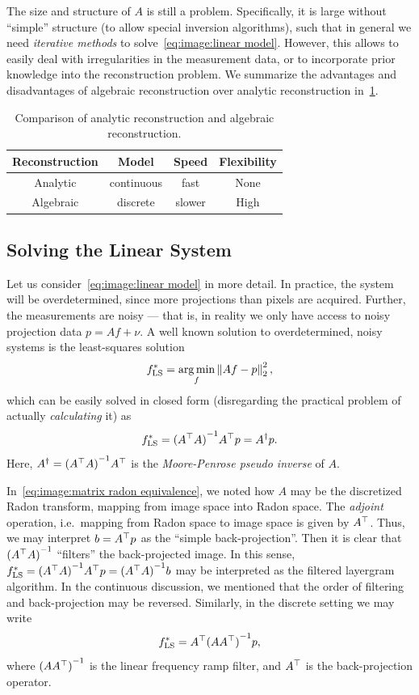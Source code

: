 \documentclass[../ml-ct.tex]{subfiles}
\begin{document}
The size and structure of \( A \) is still a problem.
Specifically, it is large without \enquote{simple} structure (to allow special inversion algorithms), such that in general we need \emph{iterative methods} to solve~\cref{eq:image:linear model}.
However, this allows to easily deal with irregularities in the measurement data, or to incorporate prior knowledge into the reconstruction problem.
We summarize the advantages and disadvantages of algebraic reconstruction over analytic reconstruction in~\cref{tab:image:analytic vs algebraic comparison}.
\begin{table}
	\centering
	\caption{Comparison of analytic reconstruction and algebraic reconstruction.}%
	\label{tab:image:analytic vs algebraic comparison}
	\begin{tabular}{cccc}
		Reconstruction & Model & Speed & Flexibility \\\toprule
		Analytic & continuous & fast & None\\
		Algebraic & discrete & slower & High \\\bottomrule
	\end{tabular}
\end{table}
\subsection{Solving the Linear System}
Let us consider~\cref{eq:image:linear model} in more detail.
In practice, the system will be overdetermined, since more projections than pixels are acquired.
Further, the measurements are noisy --- that is, in reality we only have access to noisy projection data \( p = Af + \nu \).
A well known solution to overdetermined, noisy systems is the least-squares solution
\begin{equation}
	f^*_{\text{LS}} = \operatorname*{arg\,min}_f \left\lVert Af - p\right\rVert^2_2,
\end{equation}
which can be easily solved in closed form (disregarding the practical problem of actually \emph{calculating} it) as
\begin{equation}
	f^*_{\text{LS}} = {(A^\top A)}^{-1} A^\top p = A^\dagger p.
\end{equation}
Here, \( A^\dagger = {(A^\top A)}^{-1} A^\top \) is the \emph{Moore-Penrose pseudo inverse} of \( A \).

In~\cref{eq:image:matrix radon equivalence}, we noted how \( A \) may be the discretized Radon transform, mapping from image space into Radon space.
The \emph{adjoint} operation, i.e.\ mapping from Radon space to image space is given by \( A^\top \).
Thus, we may interpret \( b = A^\top p \) as the \enquote{simple back-projection}.
Then it is clear that \( {(A^\top A)}^{-1} \) \enquote{filters} the back-projected image.
In this sense, \( f^*_{\text{LS}} = {(A^\top A)}^{-1} A^\top p = {(A^\top A)}^{-1} b \) may be interpreted as the filtered layergram algorithm.
In the continuous discussion, we mentioned that the order of filtering and back-projection may be reversed.
Similarly, in the discrete setting we may write
\begin{equation}
	f^*_{\text{LS}} = A^\top {(AA^\top)}^{-1} p,
\end{equation}
where \( {(AA^\top)}^{-1} \) is the linear frequency ramp filter, and \( A^\top \) is the back-projection operator.
\end{document}
